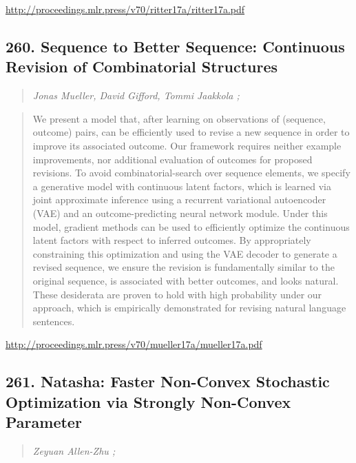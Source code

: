 \documentclass{article}
\begin{document}
\href{http://proceedings.mlr.press/v70/ritter17a/ritter17a.pdf}{http://proceedings.mlr.press/v70/ritter17a/ritter17a.pdf}

\subsection{260. Sequence to Better Sequence: Continuous Revision of Combinatorial Structures}

\begin{quote}
\footnotesize{\textit{Jonas Mueller, David Gifford, Tommi Jaakkola ;}}
\end{quote}

\begin{quote}
    We present a model that, after learning on observations of (sequence, outcome) pairs, can be efficiently used to revise a new sequence in order to improve its associated outcome. Our framework requires neither example improvements, nor additional evaluation of outcomes for proposed revisions. To avoid combinatorial-search over sequence elements, we specify a generative model with continuous latent factors, which is learned via joint approximate inference using a recurrent variational autoencoder (VAE) and an outcome-predicting neural network module. Under this model, gradient methods can be used to efficiently optimize the continuous latent factors with respect to inferred outcomes. By appropriately constraining this optimization and using the VAE decoder to generate a revised sequence, we ensure the revision is fundamentally similar to the original sequence, is associated with better outcomes, and looks natural. These desiderata are proven to hold with high probability under our approach, which is empirically demonstrated for revising natural language sentences.  \end{quote}

\href{http://proceedings.mlr.press/v70/mueller17a/mueller17a.pdf}{http://proceedings.mlr.press/v70/mueller17a/mueller17a.pdf}

\subsection{261. Natasha: Faster Non-Convex Stochastic Optimization via Strongly Non-Convex Parameter}

\begin{quote}
\footnotesize{\textit{Zeyuan Allen-Zhu ;}}
\end{quote}
\end{document}
